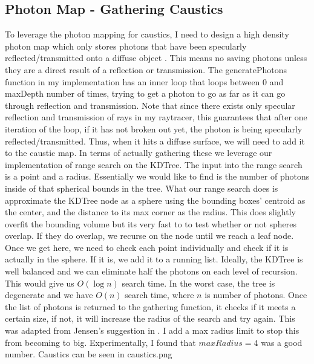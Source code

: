 \documentclass {article}
\begin{document}
\subsection{Photon Map - Gathering Caustics}
To leverage the photon mapping for caustics, I need to design a high density photon
map which only stores photons that have been specularly reflected/transmitted onto a diffuse object \cite{jensen_1996}.
This means no saving photons unless they are a direct result of a reflection or transmission. The generatePhotons function
in my implementation has an inner loop that loops between 0 and maxDepth number of times, trying to get a photon to go
as far as it can go through reflection and transmission. Note that since there exists only specular reflection and transmission
of rays in my raytracer, this guarantees that after one iteration of the loop, if it has not broken out yet, the photon is being
specularly reflected/transmitted. Thus, when it hits a diffuse surface, we will need to add it to the caustic map. In terms of
actually gathering these we leverage our implementation of range search on the KDTree. The input into the
range search is a point and a radius. Essentially we would like to find is the number of photons inside of that spherical bounds
in the tree. What our range search does is 
approximate the KDTree node as a sphere using the bounding boxes' centroid as the center, and the distance to its max
corner as the radius. This does slightly overfit the bounding volume but its very fast to to test whether or not spheres
overlap. If they do overlap, we recurse on the node until we reach a leaf node. Once we get here, we need to check each point
individually and check if it is actually in the sphere. If it is, we add it to a running list. Ideally, the KDTree is
well balanced and we can eliminate half the photons on each level of recursion. This would give us $O(\log n)$ search
time. In the worst case, the tree is degenerate and we have $O(n)$ search time, where $n$ is number of photons. Once the list
of photons is returned to the gathering function, it checks if it meets a certain size, if not, it will increase the radius
of the search and try again. This was adapted from Jensen's suggestion in \cite{jensen_1996}. 
I add a max radius limit to stop this from becoming to big. Experimentally, I found that $maxRadius=4$ was a good number.
Caustics can be seen in caustics.png
\end{document}
